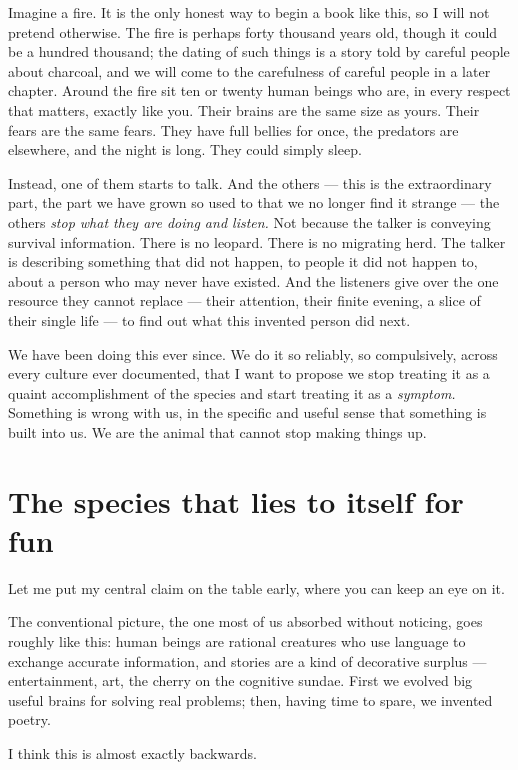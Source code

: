Imagine a fire. It is the only honest way to begin a book like this, so I will not pretend otherwise. The fire is perhaps forty thousand years old, though it could be a hundred thousand; the dating of such things is a story told by careful people about charcoal, and we will come to the carefulness of careful people in a later chapter. Around the fire sit ten or twenty human beings who are, in every respect that matters, exactly like you. Their brains are the same size as yours. Their fears are the same fears. They have full bellies for once, the predators are elsewhere, and the night is long. They could simply sleep.

Instead, one of them starts to talk. And the others — this is the extraordinary part, the part we have grown so used to that we no longer find it strange — the others \emph{stop what they are doing and listen.} Not because the talker is conveying survival information. There is no leopard. There is no migrating herd. The talker is describing something that did not happen, to people it did not happen to, about a person who may never have existed. And the listeners give over the one resource they cannot replace — their attention, their finite evening, a slice of their single life — to find out what this invented person did next.

We have been doing this ever since. We do it so reliably, so compulsively, across every culture ever documented, that I want to propose we stop treating it as a quaint accomplishment of the species and start treating it as a \emph{symptom.} Something is wrong with us, in the specific and useful sense that something is built into us. We are the animal that cannot stop making things up.

\section*{The species that lies to itself for fun}

Let me put my central claim on the table early, where you can keep an eye on it.

The conventional picture, the one most of us absorbed without noticing, goes roughly like this: human beings are rational creatures who use language to exchange accurate information, and stories are a kind of decorative surplus — entertainment, art, the cherry on the cognitive sundae. First we evolved big useful brains for solving real problems; then, having time to spare, we invented poetry.

I think this is almost exactly backwards.


